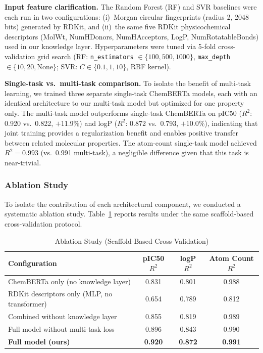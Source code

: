 \documentclass[preprint,12pt]{elsarticle}
\begin{document}
\textbf{Input feature clarification.}
The Random Forest (RF) and SVR baselines were each run in two configurations: (i)~Morgan circular fingerprints (radius 2, 2048 bits) generated by RDKit, and (ii)~the same five RDKit physicochemical descriptors (MolWt, NumHDonors, NumHAcceptors, LogP, NumRotatableBonds) used in our knowledge layer. Hyperparameters were tuned via 5-fold cross-validation grid search (RF: \texttt{n\_estimators} $\in \{100, 500, 1000\}$, \texttt{max\_depth} $\in \{10, 20, \text{None}\}$; SVR: $C \in \{0.1, 1, 10\}$, RBF kernel).

\textbf{Single-task vs.\ multi-task comparison.}
To isolate the benefit of multi-task learning, we trained three separate single-task ChemBERTa models, each with an identical architecture to our multi-task model but optimized for one property only. The multi-task model outperforms single-task ChemBERTa on pIC50 ($R^2$: 0.920 vs.\ 0.822, $+$11.9\%) and logP ($R^2$: 0.872 vs.\ 0.793, $+$10.0\%), indicating that joint training provides a regularization benefit and enables positive transfer between related molecular properties. The atom-count single-task model achieved $R^2 = 0.993$ (vs.\ 0.991 multi-task), a negligible difference given that this task is near-trivial.

\subsubsection*{Ablation Study}
\label{subsec:ablation}

To isolate the contribution of each architectural component, we conducted a systematic ablation study. Table~\ref{tab:ablation} reports results under the same scaffold-based cross-validation protocol.

\begin{table}[H]
\centering
\caption{Ablation Study (Scaffold-Based Cross-Validation)}
\label{tab:ablation}
\small
\begin{tabular}{l c c c}
\toprule
\textbf{Configuration} & \textbf{pIC50 $R^2$} & \textbf{logP $R^2$} & \textbf{Atom Count $R^2$} \\
\midrule
ChemBERTa only (no knowledge layer) & 0.831 & 0.801 & 0.988 \\
RDKit descriptors only (MLP, no transformer) & 0.654 & 0.789 & 0.812 \\
Combined without knowledge layer & 0.855 & 0.819 & 0.989 \\
Full model without multi-task loss & 0.896 & 0.843 & 0.990 \\
\textbf{Full model (ours)} & \textbf{0.920} & \textbf{0.872} & \textbf{0.991} \\
\bottomrule
\end{tabular}
\end{table}
\end{document}
